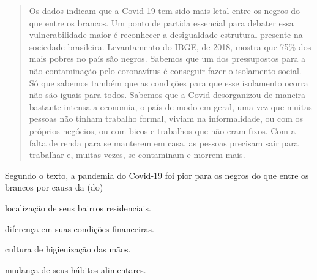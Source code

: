 \begin{quote}
Os dados indicam que a Covid-19 tem sido mais letal entre os negros
do que entre os brancos. Um ponto de partida essencial para debater essa
vulnerabilidade maior é reconhecer a desigualdade estrutural presente na
sociedade brasileira. Levantamento do IBGE, de 2018, mostra que 75\% dos
mais pobres no país são negros. Sabemos que um dos pressupostos para a
não contaminação pelo coronavírus é conseguir fazer o isolamento social.
Só que sabemos também que as condições para que esse isolamento ocorra
não são iguais para todos. Sabemos que a Covid desorganizou de maneira
bastante intensa a economia, o país de modo em geral, uma vez que muitas
pessoas não tinham trabalho formal, viviam na informalidade, ou com os
próprios negócios, ou com bicos e trabalhos que não eram fixos. Com a
falta de renda para se manterem em casa, as pessoas precisam sair para
trabalhar e, muitas vezes, se contaminam e morrem mais.

\end{quote}

Segundo o texto, a pandemia do Covid-19 foi pior para os negros do que
entre os brancos por causa da (do)

\begin{escolha}
\item localização de seus bairros residenciais.

\item diferença em suas condições financeiras.

\item cultura de higienização das mãos.

\item mudança de seus hábitos alimentares.
\end{escolha}


